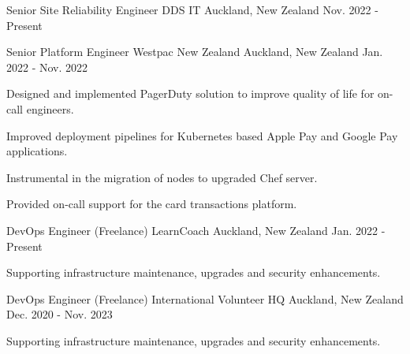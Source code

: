 


\begin{cventries}


\cventry
{Senior Site Reliability Engineer} %
{DDS IT} %
{Auckland, New Zealand} %
{Nov. 2022 - Present} %
{ %
}

\cventry
{Senior Platform Engineer} %
{Westpac New Zealand} %
{Auckland, New Zealand} %
{Jan. 2022 - Nov. 2022} %
{ %
\begin{cvitems}
\item {Designed and implemented PagerDuty solution to improve quality of life for on-call engineers.}
\item {Improved deployment pipelines for Kubernetes based Apple Pay and Google Pay applications.}
\item {Instrumental in the migration of nodes to upgraded Chef server.}
\item {Provided on-call support for the card transactions platform.}
\end{cvitems}
}


\cventry
{DevOps Engineer (Freelance)} %
{LearnCoach} %
{Auckland, New Zealand} %
{Jan. 2022 - Present} %
{ %
\begin{cvitems}
\item {Supporting infrastructure maintenance, upgrades and security enhancements.}
\end{cvitems}
}


\cventry
{DevOps Engineer (Freelance)} %
{International Volunteer HQ} %
{Auckland, New Zealand} %
{Dec. 2020 - Nov. 2023} %
{ %
\begin{cvitems}
\item {Supporting infrastructure maintenance, upgrades and security enhancements.}
\end{cvitems}
}


\end{cventries}

